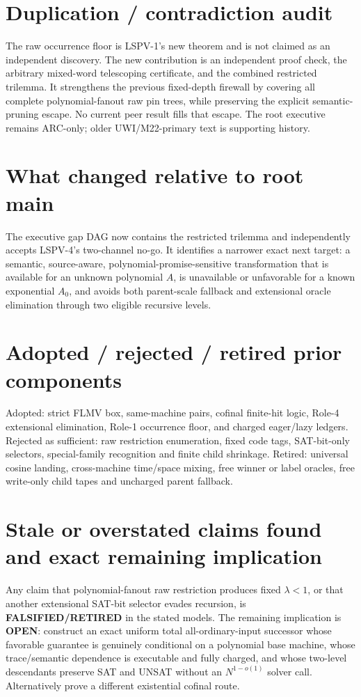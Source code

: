 \documentclass[11pt]{article}
\newcommand{\OPEN}{\textbf{OPEN}}
\begin{document}
\section{Duplication / contradiction audit}
The raw occurrence floor is LSPV-1's new theorem and is not claimed as an
independent discovery.  The new contribution is an independent proof check,
the arbitrary mixed-word telescoping certificate, and the combined restricted
trilemma.  It strengthens the previous fixed-depth firewall by covering all
complete polynomial-fanout raw pin trees, while preserving the explicit
semantic-pruning escape.  No current peer result fills that escape.  The root
executive remains ARC-only; older UWI/M22-primary text is supporting history.

\section{What changed relative to root main}
The executive gap DAG now contains the restricted trilemma and independently
accepts LSPV-4's two-channel no-go.  It identifies a narrower exact next target:
a semantic, source-aware, polynomial-promise-sensitive transformation that is
available for an unknown polynomial $A$, is unavailable or unfavorable for a
known exponential $A_0$, and avoids both parent-scale fallback and extensional
oracle elimination through two eligible recursive levels.

\section{Adopted / rejected / retired prior components}
Adopted: strict FLMV box, same-machine pairs, cofinal finite-hit logic,
Role-4 extensional elimination, Role-1 occurrence floor, and charged eager/lazy
ledgers.  Rejected as sufficient: raw restriction enumeration, fixed code tags,
SAT-bit-only selectors, special-family recognition and finite child shrinkage.
Retired: universal cosine landing, cross-machine time/space mixing, free winner
or label oracles, free write-only child tapes and uncharged parent fallback.

\section{Stale or overstated claims found and exact remaining implication}
Any claim that polynomial-fanout raw restriction produces fixed
$\lambda<1$, or that another extensional SAT-bit selector evades recursion, is
\textbf{FALSIFIED/RETIRED} in the stated models.  The remaining implication is
\OPEN{}: construct an exact uniform total all-ordinary-input successor whose
favorable guarantee is genuinely conditional on a polynomial base machine,
whose trace/semantic dependence is executable and fully charged, and whose
two-level descendants preserve SAT and UNSAT without an $N^{1-o(1)}$ solver
call.  Alternatively prove a different existential cofinal route.
\end{document}
